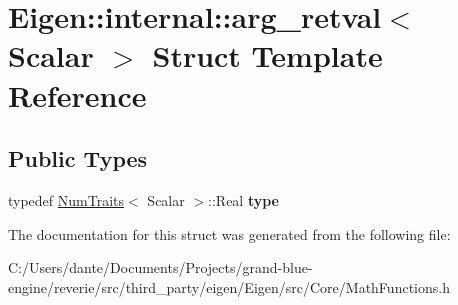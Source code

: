 \hypertarget{struct_eigen_1_1internal_1_1arg__retval}{}\section{Eigen\+::internal\+::arg\+\_\+retval$<$ Scalar $>$ Struct Template Reference}
\label{struct_eigen_1_1internal_1_1arg__retval}
\subsection*{Public Types}
\begin{DoxyCompactItemize}
\item 
\mbox{\label{struct_eigen_1_1internal_1_1arg__retval_a314ecb98eef53bf32e548c31f816535c}} 
typedef \mbox{\hyperlink{struct_eigen_1_1_num_traits}{Num\+Traits}}$<$ Scalar $>$\+::Real {\bfseries type}
\end{DoxyCompactItemize}


The documentation for this struct was generated from the following file\+:\begin{DoxyCompactItemize}
\item 
C\+:/\+Users/dante/\+Documents/\+Projects/grand-\/blue-\/engine/reverie/src/third\+\_\+party/eigen/\+Eigen/src/\+Core/Math\+Functions.\+h\end{DoxyCompactItemize}
